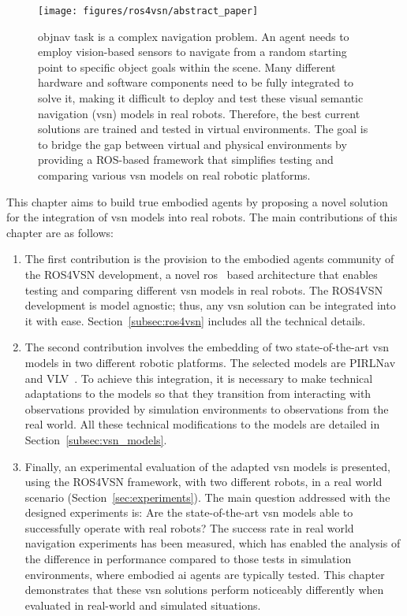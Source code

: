 \begin{figure}
    \centering
        \texttt{[image: figures/ros4vsn/abstract\_paper]}
        \caption{
        \acrshort{objnav} task is a complex navigation problem.
        An agent needs to employ vision-based sensors to navigate from a random starting point to specific object goals within the scene.
        Many different hardware and software components need to be fully integrated to solve it, making it difficult to deploy and test these visual semantic navigation (\acrshort{vsn}) models in real robots.
        Therefore, the best current solutions are trained and tested in virtual environments.
        The goal is to bridge the gap between virtual and physical environments by providing a ROS-based framework that simplifies testing and comparing various \acrshort{vsn} models on real robotic platforms.
        }
        \label{fig:abstract_ros4vsn}
\end{figure}

This chapter aims to build true embodied agents by proposing a novel solution for the integration of \acrshort{vsn} models into real robots.
The main contributions of this chapter are as follows:
\begin{enumerate}
 \item The first contribution is the provision to the embodied agents community of the ROS4VSN development, a novel \acrfull{ros}~\cite{ros} based architecture that enables testing and comparing different \acrshort{vsn} models in real robots.
 The ROS4VSN development is model agnostic; thus, any \acrshort{vsn} solution can be integrated into it with ease.
 Section~\ref{subsec:ros4vsn} includes all the technical details.
 \item The second contribution involves the embedding of two state-of-the-art \acrshort{vsn} models in two different robotic platforms.
 The selected models are PIRLNav~\cite{ramrakhya2023} and VLV~\cite{chang2020}.
 To achieve this integration, it is necessary to make technical adaptations to the models so that they transition from interacting with observations provided by simulation environments to observations from the real world.
 All these technical modifications to the models are detailed in Section~\ref{subsec:vsn_models}.
 \item Finally, an experimental evaluation of the adapted \acrshort{vsn} models is presented, using the ROS4VSN framework, with two different robots, in a real world scenario (Section~\ref{sec:experiments}).
 The main question addressed with the designed experiments is: Are the state-of-the-art \acrshort{vsn} models able to successfully operate with real robots?
 The success rate in real world navigation experiments has been measured, which has enabled the analysis of the difference in performance compared to those tests in simulation environments, where embodied \acrshort{ai} agents are typically tested.
 This chapter demonstrates that these \acrshort{vsn} solutions perform noticeably differently when evaluated in real-world and simulated situations.
\end{enumerate}

